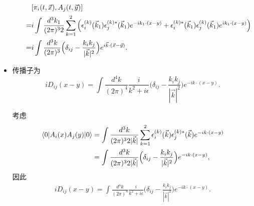 \begin{itemize}
\begin{itemize}
		\begin{tcolorbox}[title=calculation:]
			\begin{align}
				& [\pi_i(t, \vec{x}), A_j(t, \vec{y})] \notag \\
				=& i \int \frac{d^3 k_1}{(2 \pi)^3 2} \sum_{k = 1}^2 \Big( \epsilon^{(k)}_i(\vec{k}_1) \epsilon^{(k) *}_j(\vec{k}_1) e^{- i k_1 \cdot (x - y)} + \epsilon^{(k) *}_i(\vec{k}_1) \epsilon^{(k)}_j(\vec{k}_1) e^{i k_1 \cdot (x - y)} \Big) \notag \\
				=& i \int \frac{d^3 k}{(2 \pi)^3} \Big( \delta_{i j} - \frac{k_i k_j}{|\vec{k}|^2} \Big) e^{i \vec{k} \cdot (\vec{x} - \vec{y})}.
			\end{align}
		\end{tcolorbox}
	\end{itemize}
	
	\item 传播子为
	\begin{equation}
		i D_{i j}(x - y) = \int \frac{d^4 k}{(2 \pi)^4} \frac{i}{k^2 + i \epsilon} \Big( \delta_{i j} - \frac{k_i k_j}{|\vec{k}|^2} \Big) e^{- i k \cdot (x - y)}.
	\end{equation}
	
	\begin{tcolorbox}[title=calculation:]
		考虑
		\begin{align}
			\braket{0 | A_i(x) A_j(y) | 0} &= \int \frac{d^3 k}{(2 \pi)^3 2 |\vec{k}|} \sum_{k = 1}^2 \epsilon^{(k)}_i(\vec{k}) \epsilon^{(k) *}_j(\vec{k}) e^{- i k \cdot (x - y)} \notag \\
			&= \int \frac{d^3 k}{(2 \pi)^3 2 |\vec{k}|} \Big( \delta_{i j} - \frac{k_i k_j}{|\vec{k}|^2} \Big) e^{- i k \cdot (x - y)},
		\end{align}
		因此
		\begin{align}
			i D_{i j}(x - y) = \int \frac{d^4 k}{(2 \pi)^4} \frac{i}{k^2 + i \epsilon} \Big( \delta_{i j} - \frac{k_i k_j}{|\vec{k}|^2} \Big) e^{- i k \cdot (x - y)}.
		\end{align}
	\end{tcolorbox}
\end{itemize}


